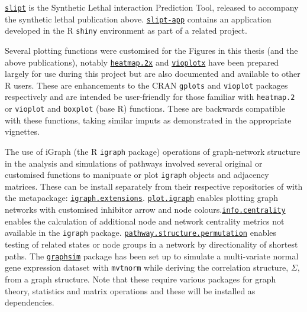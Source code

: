 \href{https://github.com/TomKellyGenetics/slipt}{\texttt{slipt}} is the Synthetic Lethal interaction Prediction Tool, released to accompany the synthetic lethal publication above. \href{https://github.com/TomKellyGenetics/slipt-app}{\texttt{slipt-app}} contains an application developed in the R \texttt{shiny} environment as part of a related project.

Several plotting functions were customised for the Figures in this thesis (and the above publications), notably \href{https://github.com/TomKellyGenetics/heatmap.2x}{\texttt{heatmap.2x}} and \href{https://github.com/TomKellyGenetics/vioplotx}{\texttt{vioplotx}} have been prepared largely for use during this project but are also documented and available to other R users. These are enhancements to the CRAN \texttt{gplots} and \texttt{vioplot} packages respectively and are intended be user-friendly for those familiar with \texttt{heatmap.2} or \texttt{vioplot} and \texttt{boxplot} (base R) functions. These are backwards compatible with these functions, taking similar imputs as demonstrated in the appropriate vignettes.

The use of iGraph (the R \texttt{igraph} package) operations of graph-network structure in the analysis and simulations of pathways involved several original or customised functions to manipuate or plot \texttt{igraph} objects and adjacency matrices. These can be install separately from their respective repositories of with the metapackage: \href{https://github.com/TomKellyGenetics/igraph.extensions}{\texttt{igraph.extensions}}. \href{https://github.com/TomKellyGenetics/plot.igraph}{\texttt{plot.igraph}} enables plotting graph networks with customised inhibitor arrow and node colours.\href{https://github.com/TomKellyGenetics/info.centrality}{\texttt{info.centrality}} enables the calculation of additional node and network centrality metrics not available in the \texttt{igraph} package. \href{https://github.com/TomKellyGenetics/pathway.structure.permutation}{\texttt{pathway\-.structure\-.permutation}} enables testing of related states or node groups in a network by directionality of shortest paths. The \href{https://github.com/TomKellyGenetics/graphsim}{\texttt{graphsim}} package has been set up to simulate a multi-variate normal gene expression dataset with \texttt{mvtnorm} while deriving the correlation structure, $\Sigma$, from a graph structure. Note that these require various packages for graph theory, statistics and matrix operations and these will be installed as dependencies.

